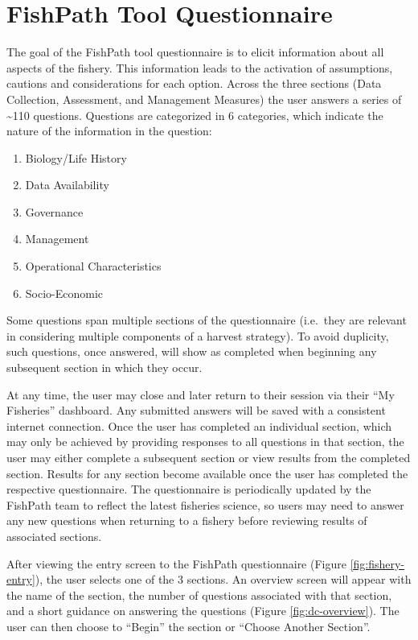 \documentclass[11pt,]{book}
\providecommand{\tightlist}{%
  \setlength{\itemsep}{0pt}\setlength{\parskip}{0pt}}
\begin{document}
\hypertarget{fishpath-tool-questionnaire}{%
\chapter{FishPath Tool Questionnaire}\label{fishpath-tool-questionnaire}}

The goal of the FishPath tool questionnaire is to elicit information about all aspects of the fishery. This information leads to the activation of assumptions, cautions and considerations for each option. Across the three sections (Data Collection, Assessment, and Management Measures) the user answers a series of \textasciitilde110 questions. Questions are categorized in 6 categories, which indicate the nature of the information in the question:

\begin{enumerate}
\def\labelenumi{\arabic{enumi}.}
\tightlist
\item
  Biology/Life History
\item
  Data Availability
\item
  Governance
\item
  Management
\item
  Operational Characteristics
\item
  Socio-Economic
\end{enumerate}

Some questions span multiple sections of the questionnaire (i.e.~they are relevant in considering multiple components of a harvest strategy). To avoid duplicity, such questions, once answered, will show as completed when beginning any subsequent section in which they occur.

At any time, the user may close and later return to their session via their ``My Fisheries'' dashboard. Any submitted answers will be saved with a consistent internet connection. Once the user has completed an individual section, which may only be achieved by providing responses to all questions in that section, the user may either complete a subsequent section or view results from the completed section. Results for any section become available once the user has completed the respective questionnaire. The questionnaire is periodically updated by the FishPath team to reflect the latest fisheries science, so users may need to answer any new questions when returning to a fishery before reviewing results of associated sections.

After viewing the entry screen to the FishPath questionnaire (Figure \ref{fig:fishery-entry}), the user selects one of the 3 sections. An overview screen will appear with the name of the section, the number of questions associated with that section, and a short guidance on answering the questions (Figure \ref{fig:dc-overview}). The user can then choose to ``Begin'' the section or ``Choose Another Section''.
\end{document}
